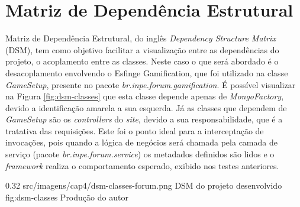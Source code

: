 
\section{Matriz de Dependência Estrutural}

\par Matriz de Dependência Estrutural, do inglês \textit{Dependency Structure Matrix} (DSM), tem como objetivo facilitar a visualização entre as dependências do projeto, o acoplamento entre as classes. Neste caso o que será abordado é o desacoplamento envolvendo o Esfinge Gamification, que foi utilizado na classe \textit{GameSetup}, presente no pacote \textit{br.inpe.forum.gamification}. É possível visualizar na Figura \ref{fig:dsm-classes} que esta classe depende apenas de \textit{MongoFactory}, devido a identificação amarela a sua esquerda. Já as classes que dependem de \textit{GameSetup} são os \textit{controllers} do \textit{site}, devido a sua responsabilidade, que é a tratativa das requisições. Este foi o ponto ideal para a interceptação de invocações, pois quando a lógica de negócios será chamada pela camada de serviço (pacote \textit{br.inpe.forum.service}) os metadados definidos são lidos e o \textit{framework} realiza o comportamento esperado, exibido nos testes anteriores.

\begin{image}
{0.32}
{src/imagens/cap4/dsm-classes-forum.png}
{DSM do projeto desenvolvido}
{fig:dsm-classes}
{Produção do autor}
\end{image}